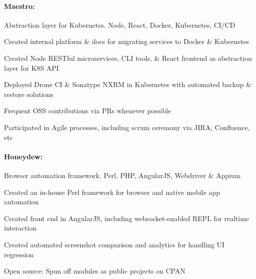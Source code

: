 \begin{position}

  \paragraph{Maestro:} Abstraction layer for Kubernetes. Node, React, Docker, Kubernetes, CI/CD
  \begin{myitem}
  \item Created internal platform \& docs for migrating services to Docker \& Kubernetes
  \item Created Node RESTful microservices, CLI tools, \& React frontend as abstraction layer for K8S API
  \item Deployed Drone CI \& Sonatype NXRM in Kubernetes with automated backup \& restore solutions
  \item Frequent OSS contributions via PRs whenever possible
  \item Participated in Agile processes, including scrum ceremony via JIRA, Confluence, etc
  \end{myitem}
  \paragraph{Honeydew:} Browser automation framework. Perl, PHP, AngularJS, Webdriver \& Appium
  \begin{myitem}
  \item Created an in-house Perl framework for browser and native mobile app automation
  \item Created front end in AngularJS, including websocket-enabled REPL for realtime interaction
  \item Created automated screenshot comparison and analytics for handling UI regression
  \item Open source: Spun off modules as public projects on CPAN
  \end{myitem}

\end{position}
